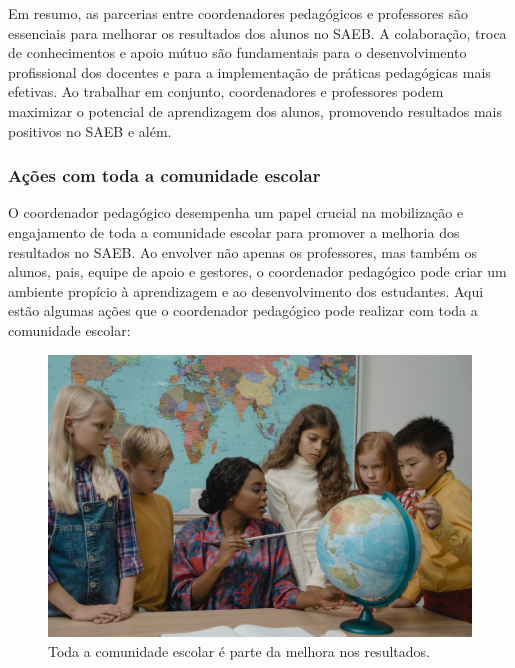 Em resumo, as parcerias entre coordenadores pedagógicos e professores
são essenciais para melhorar os resultados dos alunos no SAEB. A
colaboração, troca de conhecimentos e apoio mútuo são fundamentais para
o desenvolvimento profissional dos docentes e para a implementação de
práticas pedagógicas mais efetivas. Ao trabalhar em conjunto,
coordenadores e professores podem maximizar o potencial de aprendizagem
dos alunos, promovendo resultados mais positivos no SAEB e além.

\subsubsection{Ações com toda a comunidade
escolar}\label{auxe7uxf5es-com-toda-a-comunidade-escolar}

O coordenador pedagógico desempenha um papel crucial na mobilização e
engajamento de toda a comunidade escolar para promover a melhoria dos
resultados no SAEB. Ao envolver não apenas os professores, mas também os
alunos, pais, equipe de apoio e gestores, o coordenador pedagógico pode
criar um ambiente propício à aprendizagem e ao desenvolvimento dos
estudantes. Aqui estão algumas ações que o coordenador pedagógico pode
realizar com toda a comunidade escolar:

\begin{figure}[t]
\centering
\includegraphics[width=\textwidth]{./imgs/Imagem008.jpg}
\caption{Toda a comunidade escolar é parte da melhora nos resultados.}
\end{figure}

